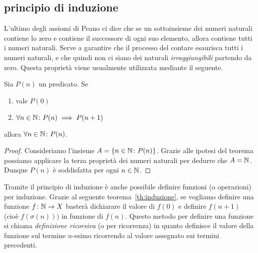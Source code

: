 \subsection{principio di induzione}

L'ultimo degli assiomi di Peano 
ci dice che se un sottoinsieme dei numeri naturali contiene lo 
zero e contiene il successore di ogni suo elemento, allora contiene tutti i 
numeri naturali.
Serve a garantire che il processo del contare esaurisca tutti 
i numeri naturali, e che quindi non ci siano dei naturali \emph{irraggiungibili}
partendo da zero.
Questa proprietà viene usualmente utilizzata mediante il seguente.


%
%
\begin{theorem}
  Sia $P(n)$ un predicato.
  Se 
  \begin{enumerate}
    \item vale $P(0)$
    \item $\forall n\in {\mathbb N}\colon P(n)\implies P(n+1)$
  \end{enumerate} 
  allora $\forall n\in {\mathbb N}\colon P(n)$.
\end{theorem}
%
\begin{proof}
  Consideriamo l'insieme $A=\{n\in {\mathbb N}\colon P(n)\}$.
  Grazie alle ipotesi del teorema possiamo applicare la terza
  proprietà dei numeri naturali per dedurre che $A={\mathbb N}$.
  Dunque $P(n)$ è soddisfatta per ogni $n\in{\mathbb N}$.
\end{proof}

Tramite il principio di induzione è anche possibile 
definire funzioni (o operazioni) per induzione.
Grazie al seguente teorema~\ref{th:induzione}, 
se vogliamo definire una funzione $f\colon{\mathbb N}\to X$
basterà dichiarare il valore di $f(0)$ e definire $f(n+1)$ 
(cioè $f(\sigma(n)))$ in funzione di $f(n)$.
Questo metodo per definire una funzione si chiama 
\emph{definizione ricorsiva} (o per ricorrenza) in quanto definisce 
il valore della funzione sul termine $n$-esimo ricorrendo
al valore assegnato sui termini precedenti.

